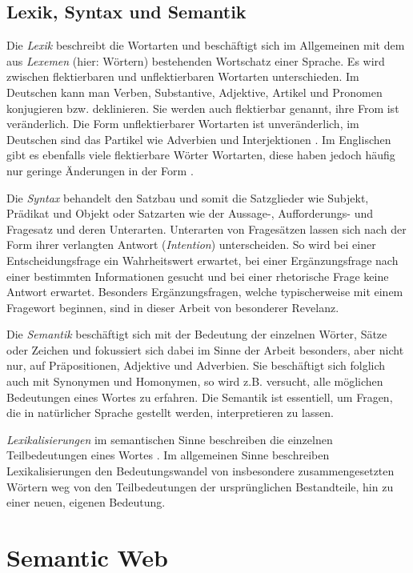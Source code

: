 \subsection{Lexik, Syntax und Semantik}
Die \emph{Lexik} beschreibt die Wortarten und beschäftigt sich im Allgemeinen mit dem aus \emph{Lexemen} (hier: Wörtern) bestehenden Wortschatz einer Sprache.
Es wird zwischen flektierbaren und unflektierbaren Wortarten unterschieden.
Im Deutschen kann man Verben, Substantive, Adjektive, Artikel und Pronomen konjugieren bzw. deklinieren.
Sie werden auch flektierbar genannt, ihre From ist veränderlich.
Die Form unflektierbarer Wortarten ist unveränderlich, im Deutschen sind das Partikel wie Adverbien und Interjektionen \citep[S.~505]{deutschbuch}.
Im Englischen gibt es ebenfalls viele flektierbare Wörter Wortarten, diese haben jedoch häufig nur geringe Änderungen in der Form \citep{englishinflection}.

Die \emph{Syntax} behandelt den Satzbau und somit die Satzglieder wie Subjekt, Prädikat und Objekt oder Satzarten wie der Aussage-, Aufforderungs- und Fragesatz und deren Unterarten.
Unterarten von Fragesätzen lassen sich nach der Form ihrer verlangten Antwort (\emph{Intention}) unterscheiden.
So wird bei einer Entscheidungsfrage ein Wahrheitswert erwartet,
bei einer Ergänzungsfrage nach einer bestimmten Informationen gesucht
und bei einer rhetorische Frage keine Antwort erwartet.
Besonders Ergänzungsfragen, welche typischerweise mit einem Fragewort beginnen, sind in dieser Arbeit von besonderer Revelanz.

Die \emph{Semantik} beschäftigt sich mit der Bedeutung der einzelnen Wörter, Sätze oder Zeichen und fokussiert sich dabei im Sinne der Arbeit besonders, aber nicht nur, auf Präpositionen, Adjektive und Adverbien.
Sie beschäftigt sich folglich auch mit Synonymen und Homonymen, so wird z.B. versucht, alle möglichen Bedeutungen eines Wortes zu erfahren.
Die Semantik ist essentiell, um Fragen, die in natürlicher Sprache gestellt werden, interpretieren zu lassen.

\emph{Lexikalisierungen} im semantischen Sinne beschreiben die einzelnen Teilbedeutungen eines Wortes \citep{semanticlexicalization}.
Im allgemeinen Sinne beschreiben Lexikalisierungen den Bedeutungswandel von insbesondere zusammengesetzten Wörtern weg von den Teilbedeutungen der ursprünglichen Bestandteile,
hin zu einer neuen, eigenen Bedeutung. 

\section{Semantic Web}

